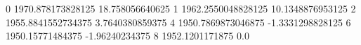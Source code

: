 0 1970.878173828125 18.758056640625
1 1962.2550048828125 10.1348876953125
2 1955.8841552734375 3.7640380859375
4 1950.7869873046875 -1.3331298828125
6 1950.15771484375 -1.96240234375
8 1952.1201171875 0.0
